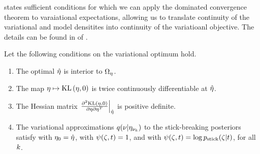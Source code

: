  states sufficient conditions for which we can apply the
dominated convergence theorem to varaiational expectations, allowing us to
translate continuity of the variational and model densitites into continuity of
the variatioanl objective.  The details can be found in  of .

\begin{assu}
%
Let the following conditions on the variational optimum hold.
%
\begin{enumerate}
%
    \item {} The optimal $\hat\eta$ is interior
    to $\Omega_{\eta}$.

    \item {} The map $\eta \mapsto \mathrm{KL}\left(\eta, 0\right)$ is twice
    continuously differentiable at $\hat\eta$.

    \item{} The Hessian matrix $\left.\frac{\partial^2 \mathrm{KL}\left(\eta,
    0\right)}{\partial \eta \partial \eta^T}\right\vert_{\hat\eta}$ is positive definite.

    \item{} The variational approximations $q(\nu
    \vert \eta_{\nu_{k}})$ to the stick-breaking posteriors satisfy
     with $\eta_0 = \hat\eta$, with $\psi(\zeta, t) = 1$,
    and with $\psi(\zeta, t) = \log p_{\mathrm{stick}}(\zeta \vert t)$, for all $k$.
%
\end{enumerate}
%
\end{assu}

